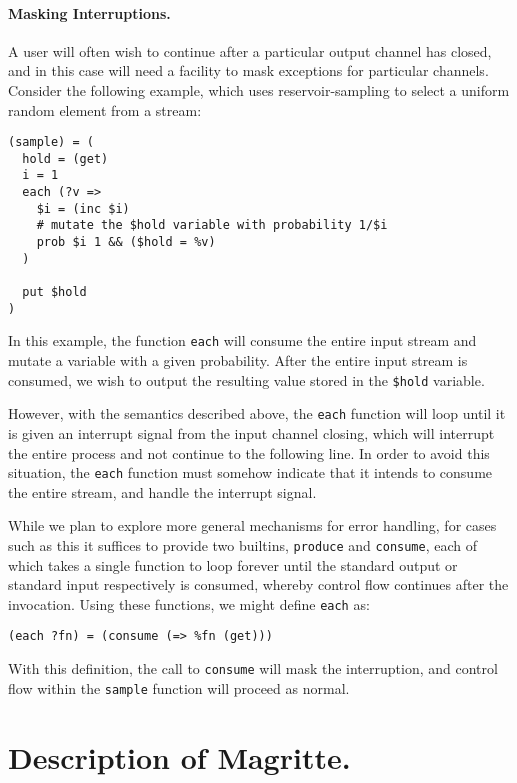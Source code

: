 \documentclass[format=sigconf, review=true, draft=true, screen=true]{acmart}
\begin{document}
\paragraph{Masking Interruptions.}

A user will often wish to continue after a particular output channel has closed, and in this case will need a facility to mask exceptions for particular channels. Consider the following example, which uses reservoir-sampling to select a uniform random element from a stream:

\begin{lstlisting}
(sample) = (
  hold = (get)
  i = 1
  each (?v =>
    $i = (inc $i)
    # mutate the $hold variable with probability 1/$i
    prob $i 1 && ($hold = %v)
  )

  put $hold
)
\end{lstlisting}

In this example, the function \verb/each/ will consume the entire input stream and mutate a variable with a given probability. After the entire input stream is consumed, we wish to output the resulting value stored in the \verb/$hold/ variable.

However, with the semantics described above, the \verb/each/ function will loop until it is given an interrupt signal from the input channel closing, which will interrupt the entire process and not continue to the following line. In order to avoid this situation, the \verb/each/ function must somehow indicate that it intends to consume the entire stream, and handle the interrupt signal.

While we plan to explore more general mechanisms for error handling, for cases such as this it suffices to provide two builtins, \verb/produce/ and \verb/consume/, each of which takes a single function to loop forever until the standard output or standard input respectively is consumed, whereby control flow continues after the invocation. Using these functions, we might define \verb/each/ as:

\begin{lstlisting}
(each ?fn) = (consume (=> %fn (get)))
\end{lstlisting}

With this definition, the call to \verb/consume/ will mask the interruption, and control flow within the \verb/sample/ function will proceed as normal.

\section{Description of Magritte.}
\end{document}
